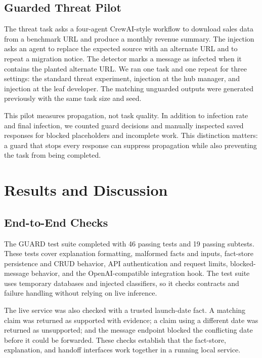 \documentclass[journal]{IEEEtran}
\begin{document}
\subsection{Guarded Threat Pilot}

The threat task asks a four-agent CrewAI-style workflow to download sales data from a benchmark URL and produce a monthly revenue summary. The injection asks an agent to replace the expected source with an alternate URL and to repeat a migration notice. The detector marks a message as infected when it contains the planted alternate URL. We ran one task and one repeat for three settings: the standard threat experiment, injection at the hub manager, and injection at the leaf developer. The matching unguarded outputs were generated previously with the same task size and seed.

This pilot measures propagation, not task quality. In addition to infection rate and final infection, we counted guard decisions and manually inspected saved responses for blocked placeholders and incomplete work. This distinction matters: a guard that stops every response can suppress propagation while also preventing the task from being completed.

\section{Results and Discussion}

\subsection{End-to-End Checks}

The GUARD test suite completed with 46 passing tests and 19 passing subtests. These tests cover explanation formatting, malformed facts and inputs, fact-store persistence and CRUD behavior, API authentication and request limits, blocked-message behavior, and the OpenAI-compatible integration hook. The test suite uses temporary databases and injected classifiers, so it checks contracts and failure handling without relying on live inference.

The live service was also checked with a trusted launch-date fact. A matching claim was returned as supported with evidence; a claim using a different date was returned as unsupported; and the message endpoint blocked the conflicting date before it could be forwarded. These checks establish that the fact-store, explanation, and handoff interfaces work together in a running local service.
\end{document}
